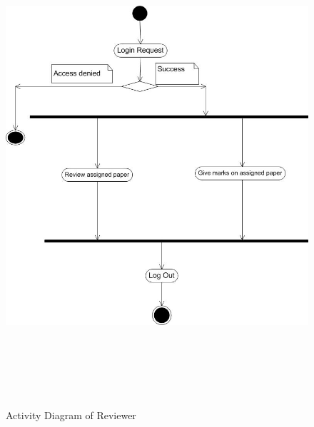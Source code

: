 \begin{figure}[h!]
\centering
  \includegraphics[width=6in,height=7in]{pic/reviewdiagram}
   \caption{Activity Diagram of Reviewer}\label{activityr}
\end{figure}









